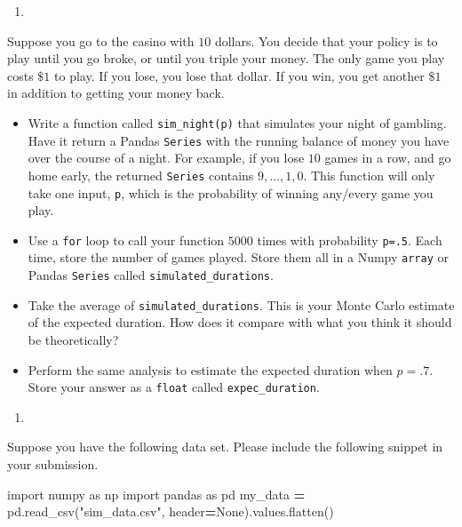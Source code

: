 \documentclass[
  12pt,
  krantz2]{krantz}
\makeatletter
\newenvironment{Shaded}{\begin{snugshade}}{\end{snugshade}}
\newcommand{\ImportTok}[1]{#1}
\newcommand{\NormalTok}[1]{#1}
\newcommand{\OperatorTok}[1]{\textcolor[rgb]{0.43,0.43,0.43}{\textbf{#1}}}
\newcommand{\StringTok}[1]{\textcolor[rgb]{0.5,0.5,0.5}{#1}}
\newcommand{\VariableTok}[1]{\textcolor[rgb]{0,0,0}{#1}}
\providecommand{\tightlist}{%
  \setlength{\itemsep}{0pt}\setlength{\parskip}{0pt}}
\newenvironment{kframe}{%
\medskip{}
\setlength{\fboxsep}{.8em}
 \def\at@end@of@kframe{}%
 \ifinner\ifhmode%
  \def\at@end@of@kframe{\end{minipage}}%
  \begin{minipage}{\columnwidth}%
 \fi\fi%
 \def\FrameCommand##1{\hskip\@totalleftmargin \hskip-\fboxsep
 \colorbox{shadecolor}{##1}\hskip-\fboxsep
     \hskip-\linewidth \hskip-\@totalleftmargin \hskip\columnwidth}%
 \MakeFramed {\advance\hsize-\width
   \@totalleftmargin\z@ \linewidth\hsize
   \@setminipage}}%
 {\par\unskip\endMakeFramed%
 \at@end@of@kframe}
\renewenvironment{Shaded}{\begin{kframe}}{\end{kframe}}
\makeatother
\begin{document}
\begin{enumerate}
\def\labelenumi{\arabic{enumi}.}
\tightlist
\item
\end{enumerate}

Suppose you go to the casino with \(10\) dollars. You decide that your policy is to play until you go broke, or until you triple your money. The only game you play costs \(\$1\) to play. If you lose, you lose that dollar. If you win, you get another \(\$1\) in addition to getting your money back.

\begin{itemize}
\tightlist
\item
  Write a function called \texttt{sim\_night(p)} that simulates your night of gambling. Have it return a Pandas \texttt{Series} with the running balance of money you have over the course of a night. For example, if you lose \(10\) games in a row, and go home early, the returned \texttt{Series} contains \(9, \ldots, 1,0\). This function will only take one input, \texttt{p}, which is the probability of winning any/every game you play.
\item
  Use a \texttt{for} loop to call your function \(5000\) times with probability \texttt{p=.5}. Each time, store the number of games played. Store them all in a Numpy \texttt{array} or Pandas \texttt{Series} called \texttt{simulated\_durations}.
\item
  Take the average of \texttt{simulated\_durations}. This is your Monte Carlo estimate of the expected duration. How does it compare with what you think it should be theoretically?
\item
  Perform the same analysis to estimate the expected duration when \(p=.7\). Store your answer as a \texttt{float} called \texttt{expec\_duration}.
\end{itemize}

\begin{enumerate}
\def\labelenumi{\arabic{enumi}.}
\setcounter{enumi}{1}
\tightlist
\item
\end{enumerate}

Suppose you have the following data set. Please include the following snippet in your submission.

\begin{Shaded}
\begin{Highlighting}[]
\ImportTok{import}\NormalTok{ numpy }\ImportTok{as}\NormalTok{ np}
\ImportTok{import}\NormalTok{ pandas }\ImportTok{as}\NormalTok{ pd}
\NormalTok{my\_data }\OperatorTok{=}\NormalTok{ pd.read\_csv(}\StringTok{"sim\_data.csv"}\NormalTok{, header}\OperatorTok{=}\VariableTok{None}\NormalTok{).values.flatten()}
\end{Highlighting}
\end{Shaded}
\end{document}
